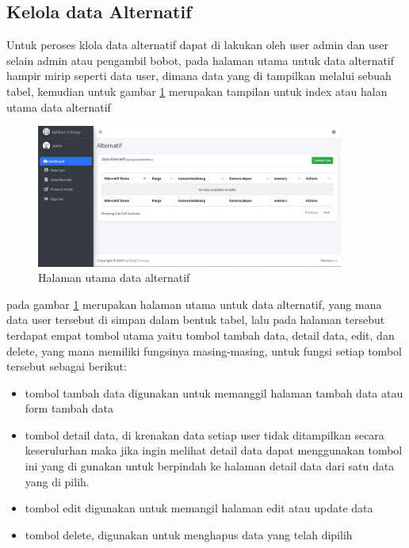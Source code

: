 \subsection{Kelola data Alternatif}
	Untuk peroses klola data alternatif dapat di lakukan oleh user admin dan user selain admin atau pengambil bobot, pada halaman utama untuk data alternatif hampir mirip seperti data user, dimana data yang di tampilkan melalui sebuah tabel, kemudian untuk gambar \ref{al1} merupakan tampilan untuk index atau halan utama data alternatif
\pagebreak
\begin{figure}[!htbp]
	\centerline{\includegraphics[width=0.90\textwidth]{figures/alte/1.png}}
	\caption{Halaman utama data alternatif}
	\label{al1}
\end{figure}

pada gambar \ref{al1} merupakan halaman utama untuk data alternatif, yang mana data user tersebut di simpan dalam bentuk tabel, lalu pada halaman tersebut terdapat empat tombol utama yaitu tombol tambah data, detail data, edit, dan delete, yang mana memiliki fungsinya masing-masing, untuk fungsi setiap tombol tersebut sebagai berikut:
\begin{itemize}
\item tombol tambah data digunakan untuk memanggil halaman tambah data atau form tambah data
\item tombol detail data, di krenakan data setiap user tidak ditampilkan secara keserulurhan maka jika ingin melihat detail data dapat menggunakan tombol ini yang di gunakan untuk berpindah ke halaman detail data dari satu data yang di pilih.
\item tombol edit digunakan untuk memangil halaman edit atau update data 
\item tombol delete, digunakan untuk menghapus data yang telah dipilih
\end{itemize}
	
